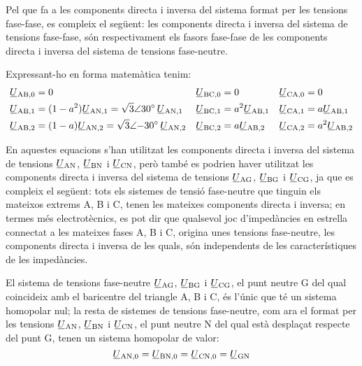 Pel que fa a les components directa i inversa del sistema format per
les tensions fase-fase, es compleix el següent: les components
directa i inversa del sistema de tensions fase-fase, són
respectivament els fasors fase-fase de les components directa i
inversa del sistema de tensions fase-neutre.

Expressant-ho en forma matemàtica tenim:
\begin{subequations}
\begin{align}
   \cmplx{U}\ped{AB,0} &= 0 &
   \cmplx{U}\ped{BC,0} &= 0 &
   \cmplx{U}\ped{CA,0} &= 0 \\
   \cmplx{U}\ped{AB,1} &= (1-a^2) \cmplx{U}\ped{AN,1} =
   \complexnum[parse-numbers=false]{\sqrt{3}:30} \,\cmplx{U}\ped{AN,1} &
   \cmplx{U}\ped{BC,1} &= a^2 \cmplx{U}\ped{AB,1} &
   \cmplx{U}\ped{CA,1} &= a \cmplx{U}\ped{AB,1} \label{eq:c_sim_a3} \\
   \cmplx{U}\ped{AB,2} &= (1-a) \cmplx{U}\ped{AN,2}  =
   \complexnum[parse-numbers=false]{\sqrt{3}:-30} \,\cmplx{U}\ped{AN,2} &
   \cmplx{U}\ped{BC,2} &= a \cmplx{U}\ped{AB,2} &
   \cmplx{U}\ped{CA,2} &= a^2 \cmplx{U}\ped{AB,2} \label{eq:c_sim_b3}
\end{align}
\end{subequations}

En aquestes equacions s'han utilitzat les components directa i
inversa del sistema de tensions
$\cmplx{U}\ped{AN}$, $\cmplx{U}\ped{BN}$ i $\cmplx{U}\ped{CN}$,
però també es podrien haver utilitzat les components directa i
inversa del sistema de tensions
$\cmplx{U}\ped{AG}$, $\cmplx{U}\ped{BG}$ i $\cmplx{U}\ped{CG}$,
ja que es compleix el següent: tots els sistemes de tensió
fase-neutre que tinguin els mateixos extrems A, B i
C, tenen les mateixes components directa i inversa; en termes
més electrotècnics, es pot dir que qualsevol joc d'impedàncies en
estrella connectat a les mateixes fases A, B i C,
origina unes tensions fase-neutre, les components directa i inversa
de les quals, són independents de les característiques de les
impedàncies.

El sistema de tensions fase-neutre
$\cmplx{U}\ped{AG}$, $\cmplx{U}\ped{BG}$ i $\cmplx{U}\ped{CG}$,
el punt neutre G del qual coincideix amb el baricentre del
triangle A, B i C, és l'únic que té un sistema homopolar nul; la resta de sistemes de tensions
 fase-neutre, com ara el format per les tensions $\cmplx{U}\ped{AN}$, $\cmplx{U}\ped{BN}$ i $\cmplx{U}\ped{CN}$,
 el punt neutre N del qual està desplaçat respecte del punt G, tenen un sistema
 homopolar de valor:
\begin{equation}
    \cmplx{U}\ped{AN,0} = \cmplx{U}\ped{BN,0} =
    \cmplx{U}\ped{CN,0} = \cmplx{U}\ped{GN}\label{eq:tens-hom}
\end{equation}

